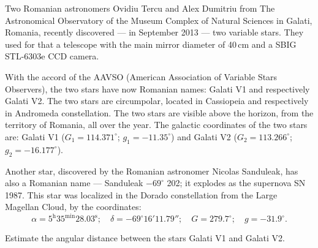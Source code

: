 Two Romanian astronomers Ovidiu Tercu and Alex Dumitriu from The Astronomical
Observatory of the Museum Complex of Natural Sciences in Galati, Romania,
recently discovered --- in September 2013 --- two variable stars. They used
for that a telescope with the main mirror diameter of 40\,cm and a SBIG
STL-6303e CCD camera.

With the accord of the AAVSO (American Association of Variable Stars
Observers), the two stars have now Romanian names: Galati V1 and respectively
Galati V2. The two stars are circumpolar, located in Cassiopeia and
respectively in Andromeda constellation. The two stars are visible above the
horizon, from the territory of Romania, all over the year. The galactic
coordinates of the two stars are: Galati V1 ($G_1 = 114.371^\circ$;
$g_1 = -11.35^\circ$) and Galati V2 ($G_2 = 113.266^\circ$;
$g_2 = -16.177^\circ$).

Another star, discovered by the Romanian astronomer Nicolas Sanduleak, has
also a Romanian name --- Sanduleak $-69^\circ$ 202; it explodes as the
supernova SN 1987. This star was localized in the Dorado constellation from
the Large Magellan Cloud, by the coordinates:
\[
\alpha = 5^{\mathrm{h}}35^{\mathrm{min}}28.03^{\mathrm{s}};\quad
\delta = -69^\circ 16' 11.79'';\quad
G = 279.7^\circ;\quad
g = -31.9^\circ.
\]

Estimate the angular distance between the stars Galati V1 and Galati V2.
